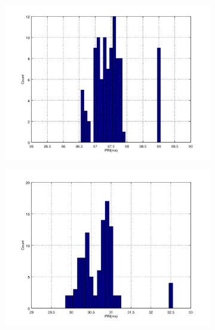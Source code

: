 \begin{figure}[ht!]
	\centering
	\begin{subfigure}{0.4\textwidth}
	{
		\includegraphics[width=\textwidth]{fig/noncoresec_ping_telosb_sw.png}
	}
	\end{subfigure}
	\begin{subfigure}{0.4\textwidth}
	{
		\includegraphics[width=\textwidth]{fig/noncoresec_ping_telosb_hw.png}
	}
	\end{subfigure}
	\begin{subfigure}{0.4\textwidth}
	{
}
\end{subfigure}
\end{figure}
